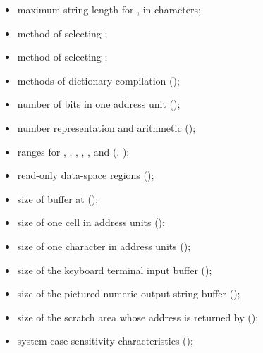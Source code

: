 \begin{itemize}
\item maximum string length for
	, in characters;

\item method of selecting ;

\item method of selecting ;

\item methods of dictionary compilation
	();

\item number of bits in one address unit
	();

\item number representation and arithmetic
	();

\item ranges for , , , ,
	, and 
	(,
	 );

\item read-only data-space regions
	();

\item size of buffer at 
	();

\item size of one cell in address units
	();

\item size of one character in address units
	();

\item size of the keyboard terminal input buffer
	();

\item size of the pictured numeric output string buffer
	();

\item size of the scratch area whose address is returned by
	 ();

\item system case-sensitivity characteristics
	();


\end{itemize}
